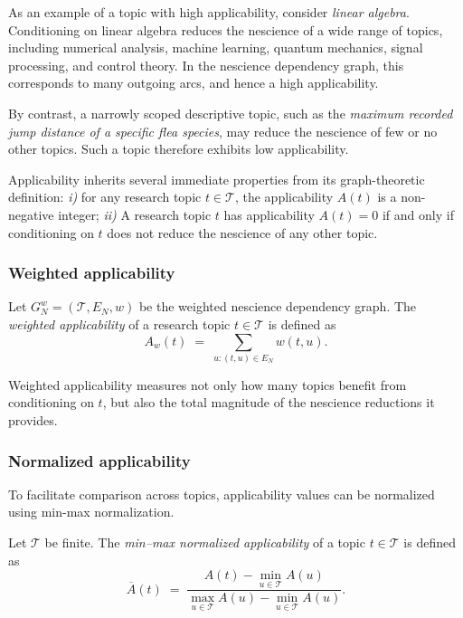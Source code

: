 \begin{example}
As an example of a topic with high applicability, consider \emph{linear algebra}. Conditioning on linear algebra reduces the nescience of a wide range of topics, including numerical analysis, machine learning, quantum mechanics, signal processing, and control theory. In the nescience dependency graph, this corresponds to many outgoing arcs, and hence a high applicability.

By contrast, a narrowly scoped descriptive topic, such as the \emph{maximum recorded jump distance of a specific flea species}, may reduce the nescience of few or no other topics. Such a topic therefore exhibits low applicability.
\end{example}

Applicability inherits several immediate properties from its graph-theoretic definition: \emph{i)} for any research topic $t \in \mathcal{T}$, the applicability $A(t)$ is a non-negative integer; \emph{ii)} A research topic $t$ has applicability $A(t) = 0$ if and only if conditioning on $t$ does not reduce the nescience of any other topic.


\subsubsection*{Weighted applicability}

\begin{definition}
Let $G_N^w = (\mathcal{T}, E_N, w)$ be the weighted nescience dependency graph. The \emph{weighted applicability} of a research topic $t \in \mathcal{T}$ is defined as
\[
A_w(t) \;=\; \sum_{u : (t,u) \in E_N} w(t,u).
\]
\end{definition}

Weighted applicability measures not only how many topics benefit from conditioning on $t$, but also the total magnitude of the nescience reductions it provides.


\subsubsection{Normalized applicability}

To facilitate comparison across topics, applicability values can be normalized using min-max normalization.

\begin{definition}
Let $\mathcal{T}$ be finite. The \emph{min--max normalized applicability} of a topic $t \in \mathcal{T}$ is defined as
\[
\overline{A}(t) \;=\;
\frac{A(t) - \min_{u \in \mathcal{T}} A(u)}
{\max_{u \in \mathcal{T}} A(u) - \min_{u \in \mathcal{T}} A(u)}.
\]
\end{definition}

